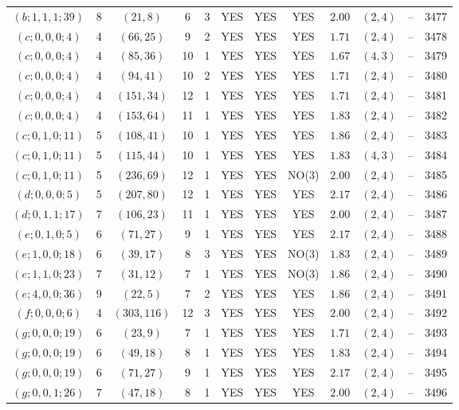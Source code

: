 \begin{longtable}{|c|c|c|c|c|c|c|c|c|c|c|c|}
$(b;1,1,1;39)$ & 8 & $(21,8)$ & 6 & 3 & YES & YES & YES & $2.00$ & $(2,4)$ & -- & 3477\\
$(c;0,0,0;4)$ & 4 & $(66,25)$ & 9 & 2 & YES & YES & YES & $1.71$ & $(2,4)$ & -- & 3478\\
$(c;0,0,0;4)$ & 4 & $(85,36)$ & 10 & 1 & YES & YES & YES & $1.67$ & $(4,3)$ & -- & 3479\\
$(c;0,0,0;4)$ & 4 & $(94,41)$ & 10 & 2 & YES & YES & YES & $1.71$ & $(2,4)$ & -- & 3480\\
$(c;0,0,0;4)$ & 4 & $(151,34)$ & 12 & 1 & YES & YES & YES & $1.71$ & $(2,4)$ & -- & 3481\\
$(c;0,0,0;4)$ & 4 & $(153,64)$ & 11 & 1 & YES & YES & YES & $1.83$ & $(2,4)$ & -- & 3482\\
$(c;0,1,0;11)$ & 5 & $(108,41)$ & 10 & 1 & YES & YES & YES & $1.86$ & $(2,4)$ & -- & 3483\\
$(c;0,1,0;11)$ & 5 & $(115,44)$ & 10 & 1 & YES & YES & YES & $1.83$ & $(4,3)$ & -- & 3484\\
$(c;0,1,0;11)$ & 5 & $(236,69)$ & 12 & 1 & YES & YES & NO(3) & $2.00$ & $(2,4)$ & -- & 3485\\
$(d;0,0,0;5)$ & 5 & $(207,80)$ & 12 & 1 & YES & YES & YES & $2.17$ & $(2,4)$ & -- & 3486\\
$(d;0,1,1;17)$ & 7 & $(106,23)$ & 11 & 1 & YES & YES & YES & $2.00$ & $(2,4)$ & -- & 3487\\
$(e;0,1,0;5)$ & 6 & $(71,27)$ & 9 & 1 & YES & YES & YES & $2.17$ & $(2,4)$ & -- & 3488\\
$(e;1,0,0;18)$ & 6 & $(39,17)$ & 8 & 3 & YES & YES & NO(3) & $1.83$ & $(2,4)$ & -- & 3489\\
$(e;1,1,0;23)$ & 7 & $(31,12)$ & 7 & 1 & YES & YES & NO(3) & $1.86$ & $(2,4)$ & -- & 3490\\
$(e;4,0,0;36)$ & 9 & $(22,5)$ & 7 & 2 & YES & YES & YES & $1.86$ & $(2,4)$ & -- & 3491\\
$(f;0,0,0;6)$ & 4 & $(303,116)$ & 12 & 3 & YES & YES & YES & $2.00$ & $(2,4)$ & -- & 3492\\
$(g;0,0,0;19)$ & 6 & $(23,9)$ & 7 & 1 & YES & YES & YES & $1.71$ & $(2,4)$ & -- & 3493\\
$(g;0,0,0;19)$ & 6 & $(49,18)$ & 8 & 1 & YES & YES & YES & $1.83$ & $(2,4)$ & -- & 3494\\
$(g;0,0,0;19)$ & 6 & $(71,27)$ & 9 & 1 & YES & YES & YES & $2.17$ & $(2,4)$ & -- & 3495\\
$(g;0,0,1;26)$ & 7 & $(47,18)$ & 8 & 1 & YES & YES & YES & $2.00$ & $(2,4)$ & -- & 3496\\

\end{longtable}
